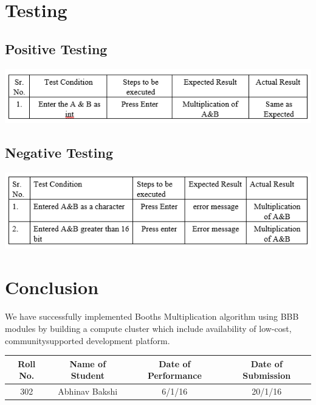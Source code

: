 \documentclass[a4paper,12pt]{article}
\begin{document}
\section{Testing}
\subsection{Positive Testing}
	\includegraphics[width=\textwidth]{booth_positive}
\subsection{Negative Testing}
	\includegraphics[width=\textwidth]{booth_negative}

\section{Conclusion}
	\paragraph{} We have successfully implemented Booths Multiplication algorithm using BBB modules by building a compute cluster which include availability of low-cost, communitysupported development platform.  
\vspace{20px}
\begin{center}
	\begin{tabular}
		{|c|c|c|c|}\hline
		{\bf Roll No.}		&{\bf Name of Student}		&{\bf Date of Performance}  				&{\bf Date of Submission}  \\ \hline
		{302}	&	{Abhinav Bakshi}& {6/1/16}	&  {20/1/16}\\ \hline
	\end{tabular}\\ 
\end{center}
\end{document}

